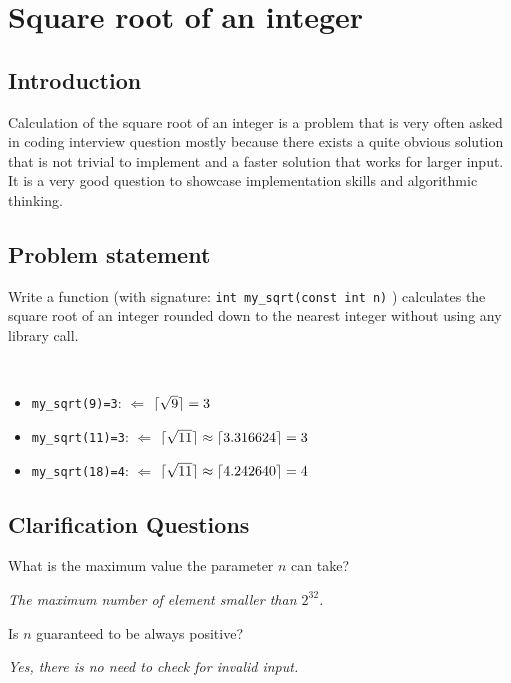 %


\chapter{Square root of an integer}
\label{ch:square_root}
\section*{Introduction}
Calculation of the square root of an integer is a problem that is very often asked in coding interview question mostly because there exists a quite obvious solution that is not trivial to implement and a faster solution that works for larger input. It is a very good question to showcase implementation skills and algorithmic thinking.

\section{Problem statement}
Write a function (with signature: \lstinline[columns=fixed]{int my_sqrt(const int n)} ) calculates the square root of an integer rounded down to the nearest integer without using any library call.

\begin{example}
	\hfill \\
	\begin{itemize}
		\item[-] 	\lstinline[columns=fixed]{my_sqrt(9)=3}: $\Longleftarrow $ $\lceil\sqrt{9}\rceil=3$
		\item[-] 	\lstinline[columns=fixed]{my_sqrt(11)=3}: $\Longleftarrow $ $\lceil\sqrt{11}\rceil\approx\lceil3.316624\rceil=3$
		\item[-] 	\lstinline[columns=fixed]{my_sqrt(18)=4}: $\Longleftarrow $ $\lceil\sqrt{11}\rceil\approx\lceil4.242640\rceil=4$
	\end{itemize}

\end{example}

\section{Clarification Questions}

\begin{QandA}
	\item What is the maximum value the parameter $n$ can take?
	\begin{answered}
		\textit{The maximum number of element smaller than $2^{32}$.}
	\end{answered}
	
	\item Is $n$ guaranteed to be always positive?
	\begin{answered}
		\textit{Yes, there is no need to check for invalid input.}
	\end{answered}
\end{QandA}

